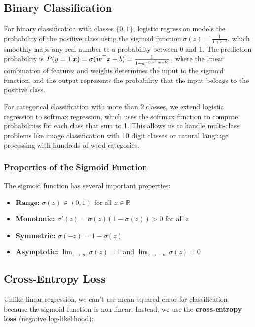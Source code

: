 \subsection{Binary Classification}

For binary classification with classes $\{0, 1\}$, logistic regression models the probability of the positive class using the sigmoid function $\sigma(z) = \frac{1}{1 + e^{-z}}$, which smoothly maps any real number to a probability between 0 and 1. The prediction probability is $P(y=1|\boldsymbol{x}) = \sigma(\boldsymbol{w}^\top \boldsymbol{x} + b) = \frac{1}{1 + e^{-(\boldsymbol{w}^\top \boldsymbol{x} + b)}}$, where the linear combination of features and weights determines the input to the sigmoid function, and the output represents the probability that the input belongs to the positive class.

\begin{remark}
For categorical classification with more than 2 classes, we extend logistic regression to softmax regression, which uses the softmax function to compute probabilities for each class that sum to 1. This allows us to handle multi-class problems like image classification with 10 digit classes or natural language processing with hundreds of word categories.
\end{remark}

\subsubsection{Properties of the Sigmoid Function}

The sigmoid function has several important properties:
\begin{itemize}
    \item \textbf{Range:} $\sigma(z) \in (0, 1)$ for all $z \in \mathbb{R}$
    \item \textbf{Monotonic:} $\sigma'(z) = \sigma(z)(1-\sigma(z)) > 0$ for all $z$
    \item \textbf{Symmetric:} $\sigma(-z) = 1 - \sigma(z)$
    \item \textbf{Asymptotic:} $\lim_{z \to \infty} \sigma(z) = 1$ and $\lim_{z \to -\infty} \sigma(z) = 0$
\end{itemize}

\subsection{Cross-Entropy Loss}

Unlike linear regression, we can't use mean squared error for classification because the sigmoid function is non-linear. Instead, we use the \textbf{cross-entropy loss} (negative log-likelihood):


